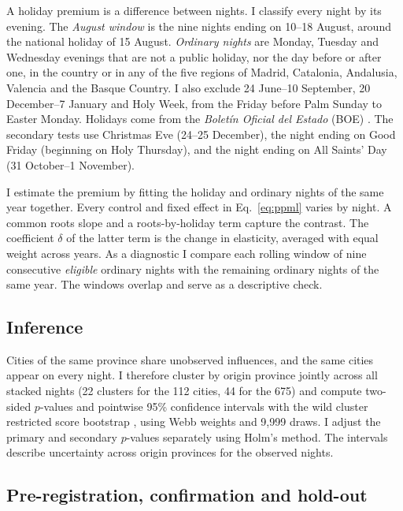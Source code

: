 \documentclass[pdflatex,sn-mathphys-num,referee]{sn-jnl}
\begin{document}
A holiday premium is a difference between nights. I classify every night by its evening. The \emph{August window} is the nine nights ending on 10--18 August, around the national holiday of 15 August. \emph{Ordinary nights} are Monday, Tuesday and Wednesday evenings that are not a public holiday, nor the day before or after one, in the country or in any of the five regions of Madrid, Catalonia, Andalusia, Valencia and the Basque Country. I also exclude 24 June--10 September, 20 December--7 January and Holy Week, from the Friday before Palm Sunday to Easter Monday. Holidays come from the \emph{Boletín Oficial del Estado} (BOE) \cite{boe2022calendar,boe2023calendar,boe2024calendar,boe2025calendar}. The secondary tests use Christmas Eve (24--25 December), the night ending on Good Friday (beginning on Holy Thursday), and the night ending on All Saints' Day (31 October--1 November).

I estimate the premium by fitting the holiday and ordinary nights of the same year together. Every control and fixed effect in Eq.~\eqref{eq:ppml} varies by night. A common roots slope and a roots-by-holiday term capture the contrast. The coefficient $\delta$ of the latter term is the change in elasticity, averaged with equal weight across years. As a diagnostic I compare each rolling window of nine consecutive \emph{eligible} ordinary nights with the remaining ordinary nights of the same year. The windows overlap and serve as a descriptive check.

\subsection{Inference}

Cities of the same province share unobserved influences, and the same cities appear on every night. I therefore cluster by origin province jointly across all stacked nights (22 clusters for the 112 cities, 44 for the 675) and compute two-sided $p$-values and pointwise 95\% confidence intervals with the wild cluster restricted score bootstrap \cite{kline2012score,webb2023reworking}, using Webb weights and 9,999 draws. I adjust the primary and secondary $p$-values separately using Holm's method. The intervals describe uncertainty across origin provinces for the observed nights.

\subsection{Pre-registration, confirmation and hold-out}\label{sec:prereg}
\end{document}
